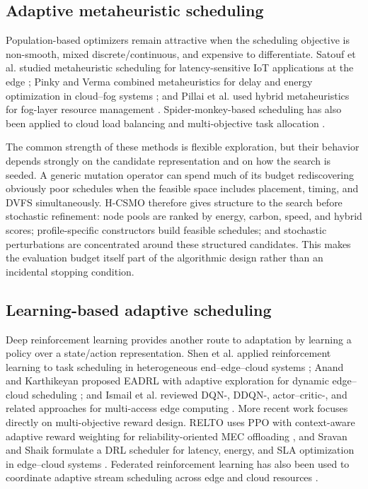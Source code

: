 \documentclass[preprint,12pt]{elsarticle}
\newcommand{\method}{H-CSMO\xspace}
\begin{document}
\subsection{Adaptive metaheuristic scheduling}

Population-based optimizers remain attractive when the scheduling objective is non-smooth, mixed discrete/continuous, and expensive to differentiate. Satouf et al. studied metaheuristic scheduling for latency-sensitive IoT applications at the edge \cite{satouf2025metaheuristic}; Pinky and Verma combined metaheuristics for delay and energy optimization in cloud--fog systems \cite{pinky2025enhanced}; and Pillai et al. used hybrid metaheuristics for fog-layer resource management \cite{sanjaikanth2025optimizing}. Spider-monkey-based scheduling has also been applied to cloud load balancing and multi-objective task allocation \cite{verma2024load,amer2024efficient,khaleel2025application}.

The common strength of these methods is flexible exploration, but their behavior depends strongly on the candidate representation and on how the search is seeded. A generic mutation operator can spend much of its budget rediscovering obviously poor schedules when the feasible space includes placement, timing, and DVFS simultaneously. \method therefore gives structure to the search before stochastic refinement: node pools are ranked by energy, carbon, speed, and hybrid scores; profile-specific constructors build feasible schedules; and stochastic perturbations are concentrated around these structured candidates. This makes the evaluation budget itself part of the algorithmic design rather than an incidental stopping condition.

\subsection{Learning-based adaptive scheduling}

Deep reinforcement learning provides another route to adaptation by learning a policy over a state/action representation. Shen et al. applied reinforcement learning to task scheduling in heterogeneous end--edge--cloud systems \cite{shen2025reinforcement}; Anand and Karthikeyan proposed EADRL with adaptive exploration for dynamic edge--cloud scheduling \cite{anand2025eadrl}; and Ismail et al. reviewed DQN-, DDQN-, actor--critic-, and related approaches for multi-access edge computing \cite{ismail2025survey}. More recent work focuses directly on multi-objective reward design. RELTO uses PPO with context-aware adaptive reward weighting for reliability-oriented MEC offloading \cite{nasir2026relto}, and Sravan and Shaik formulate a DRL scheduler for latency, energy, and SLA optimization in edge--cloud systems \cite{sravan2026drl}. Federated reinforcement learning has also been used to coordinate adaptive stream scheduling across edge and cloud resources \cite{lajili2026federated}.
\end{document}
